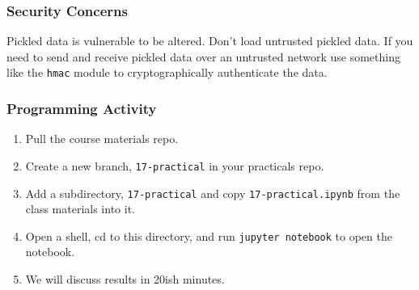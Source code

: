 \documentclass[10pt]{beamer}
\begin{document}
\begin{frame}
  \frametitle{Security Concerns}
  
  Pickled data is vulnerable to be altered. Don't load untrusted pickled data.
  If you need to send and receive pickled data over an untrusted network use
  something like the \texttt{hmac} module to cryptographically authenticate the data.
    
  \end{frame}
  
\begin{frame}
  \frametitle{Programming Activity}
  
  \begin{enumerate}
    \item Pull the course materials repo.
    \item Create a new branch, \texttt{17-practical} in your practicals repo.
    \item Add a subdirectory,  \texttt{17-practical} and copy \texttt{17-practical.ipynb} from the class materials into it.
    \item Open a shell, cd to this directory, and run \texttt{jupyter notebook} to open the notebook. 
    \item We will discuss results in 20ish minutes.
  \end{enumerate}      
\end{frame}
  
\end{document}
